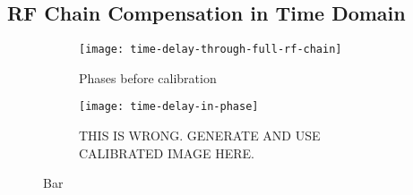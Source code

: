 \subsection{RF Chain Compensation in Time Domain}

\begin{figure}
  \centering
  \begin{subfigure}[b]{0.49\textwidth}
    \centering
    \texttt{[image: time-delay-through-full-rf-chain]}
    \caption{Phases before calibration}
  \end{subfigure}
  \begin{subfigure}[b]{0.49\textwidth}
    \centering
    \texttt{[image: time-delay-in-phase]}
    \caption{THIS IS WRONG. GENERATE AND USE CALIBRATED IMAGE HERE.}
  \end{subfigure}
  \caption{Bar}
\end{figure}

